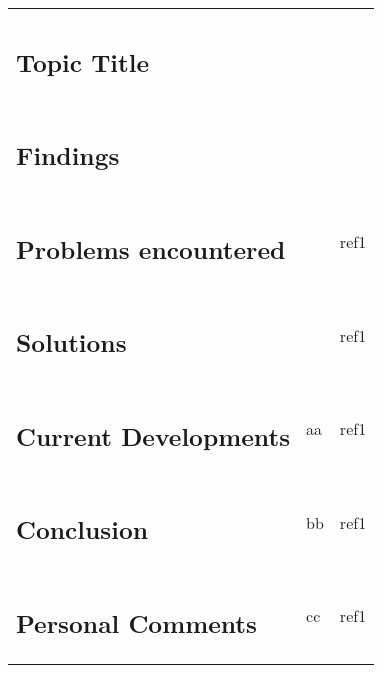 \documentclass[11pt,a4paper,numbers=noenddot]{scrartcl}
\begin{document}
\begin{xtabular}{|p{3cm}|p{10cm}|p{4cm}|}
	\vspace*{-1.25\baselineskip}\subsection{Topic Title}
	& 
	\lipsum[1]
	&  \\
	\vspace*{-1.25\baselineskip}\subsection{Findings}
	& 
	\lipsum[1]
	&  \\
	\vspace*{-1.25\baselineskip}\subsection{Problems encountered}
	& 
	\lipsum[1]
	& ref1 \\
	\vspace*{-1.25\baselineskip}\subsection{Solutions}
	& 
	\lipsum[1]
	& ref1 \\
	\vspace*{-1.25\baselineskip}\subsection{Current Developments}
	& 
	aa
	& ref1 \\
	\vspace*{-1.25\baselineskip}\subsection{Conclusion}
	& 
	bb
	& ref1 \\
	\vspace*{-1.25\baselineskip}\subsection{Personal Comments}
	& 
	cc
	& ref1 \\
	\hline
\end{xtabular}
\end{document}

